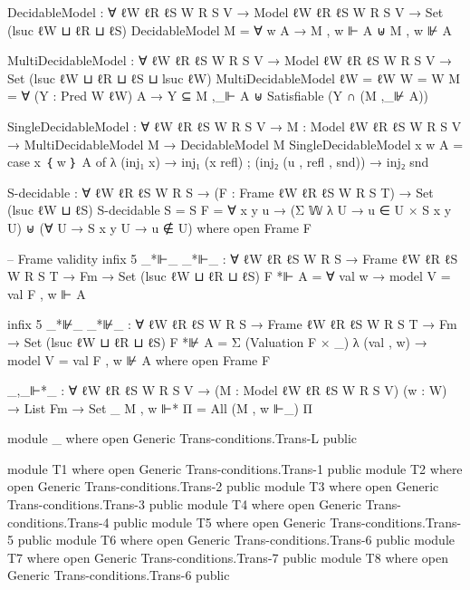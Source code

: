 \begin{spverbatim}
  DecidableModel : ∀ {ℓW ℓR ℓS W R S V} → Model {ℓW} {ℓR} {ℓS} W R S V
    → Set (lsuc ℓW ⊔ ℓR ⊔ ℓS)
  DecidableModel M = ∀ w A → M , w ⊩ A ⊎ M , w ⊮ A

  MultiDecidableModel : ∀ {ℓW ℓR ℓS W R S V} → Model {ℓW} {ℓR} {ℓS} W R S V
    → Set (lsuc ℓW ⊔ ℓR ⊔ ℓS ⊔ lsuc ℓW)
  MultiDecidableModel {ℓW = ℓW} {W = W} M =
    ∀ (Y : Pred W ℓW) A → Y ⊆ M ,_⊩ A ⊎ Satisfiable (Y ∩ (M ,_⊮ A))

  SingleDecidableModel : ∀ {ℓW ℓR ℓS W R S V} → {M : Model {ℓW} {ℓR} {ℓS} W R S V}
    → MultiDecidableModel M → DecidableModel M
  SingleDecidableModel x w A = case x ｛ w ｝ A of
    λ { (inj₁ x) → inj₁ (x refl) ; (inj₂ (u , refl , snd)) → inj₂ snd}

  S-decidable : ∀ {ℓW ℓR ℓS W R S} → (F :  Frame {ℓW} {ℓR} {ℓS} W R S T)
    → Set (lsuc ℓW ⊔ ℓS)
  S-decidable {S = S} F = ∀ x y u → (Σ 𝕎 λ U → u ∈ U × S x y U) ⊎ (∀ U → S x y U → u ∉ U)
    where open Frame F

-- Frame validity
  infix 5 _*⊩_
  _*⊩_ : ∀ {ℓW ℓR ℓS W R S} → Frame {ℓW} {ℓR} {ℓS} W R S T → Fm → Set (lsuc ℓW ⊔ ℓR ⊔ ℓS)
  F *⊩ A = ∀ val w → model {V = val} F , w ⊩ A

  infix 5 _*⊮_
  _*⊮_ : ∀ {ℓW ℓR ℓS W R S} → Frame {ℓW} {ℓR} {ℓS} W R S T → Fm → Set (lsuc ℓW ⊔ ℓR ⊔ ℓS)
  F *⊮ A = Σ (Valuation F × _) λ { (val , w) → model {V = val} F , w ⊮ A}
    where open Frame F

  _,_⊩*_ : ∀ {ℓW ℓR ℓS W R S V} → (M : Model {ℓW} {ℓR} {ℓS} W R S V) (w : W) → List Fm → Set _
  M , w ⊩* Π = All (M , w ⊩_) Π

module _ where open Generic Trans-conditions.Trans-L public

module T1 where open Generic Trans-conditions.Trans-1 public
module T2 where open Generic Trans-conditions.Trans-2 public
module T3 where open Generic Trans-conditions.Trans-3 public
module T4 where open Generic Trans-conditions.Trans-4 public
module T5 where open Generic Trans-conditions.Trans-5 public
module T6 where open Generic Trans-conditions.Trans-6 public
module T7 where open Generic Trans-conditions.Trans-7 public
module T8 where open Generic Trans-conditions.Trans-6 public
\end{spverbatim}
